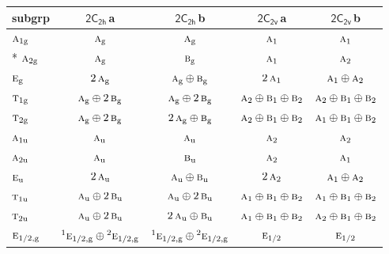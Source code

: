\documentclass[10pt,a4paper]{article}
\numberwithin{equation}{section}
\newcommand{\grp}[1]{\mathsf{#1}}
\newcommand{\irr}[1]{\text{\normalfont\scshape #1}}
\newcommand{\conjpair}[1]{{}^{#1}}
\newcommand{\ptag}[1]{\mathrm{#1}}
\newcommand{\clsletter}[1]{\,{\scriptsize\color{black!55}#1}}
\begin{document}
{\small\begin{longtable}{@{}lcccc@{}}\toprule
subgrp & \href{2C2h.pdf}{$\grp{2C_{2h}}$}\clsletter{a} & \href{2C2h.pdf}{$\grp{2C_{2h}}$}\clsletter{b} & \href{2C2v.pdf}{$\grp{2C_{2v}}$}\clsletter{a} & \href{2C2v.pdf}{$\grp{2C_{2v}}$}\clsletter{b}\\\midrule\endhead
\bottomrule\endfoot\endlastfoot
$\irr{a}_{1\ptag{g}}$ & $\irr{a}_{\ptag{g}}$ & $\irr{a}_{\ptag{g}}$ & $\irr{a}_{1}$ & $\irr{a}_{1}$\\*
$\irr{a}_{2\ptag{g}}$ & $\irr{a}_{\ptag{g}}$ & $\irr{b}_{\ptag{g}}$ & $\irr{a}_{1}$ & $\irr{a}_{2}$\\
$\irr{e}_{\ptag{g}}$ & $2\,\irr{a}_{\ptag{g}}$ & $\irr{a}_{\ptag{g}}\oplus \irr{b}_{\ptag{g}}$ & $2\,\irr{a}_{1}$ & $\irr{a}_{1}\oplus \irr{a}_{2}$\\
$\irr{t}_{1\ptag{g}}$ & $\irr{a}_{\ptag{g}}\oplus 2\,\irr{b}_{\ptag{g}}$ & $\irr{a}_{\ptag{g}}\oplus 2\,\irr{b}_{\ptag{g}}$ & $\irr{a}_{2}\oplus \irr{b}_{1}\oplus \irr{b}_{2}$ & $\irr{a}_{2}\oplus \irr{b}_{1}\oplus \irr{b}_{2}$\\
$\irr{t}_{2\ptag{g}}$ & $\irr{a}_{\ptag{g}}\oplus 2\,\irr{b}_{\ptag{g}}$ & $2\,\irr{a}_{\ptag{g}}\oplus \irr{b}_{\ptag{g}}$ & $\irr{a}_{2}\oplus \irr{b}_{1}\oplus \irr{b}_{2}$ & $\irr{a}_{1}\oplus \irr{b}_{1}\oplus \irr{b}_{2}$\\
$\irr{a}_{1\ptag{u}}$ & $\irr{a}_{\ptag{u}}$ & $\irr{a}_{\ptag{u}}$ & $\irr{a}_{2}$ & $\irr{a}_{2}$\\
$\irr{a}_{2\ptag{u}}$ & $\irr{a}_{\ptag{u}}$ & $\irr{b}_{\ptag{u}}$ & $\irr{a}_{2}$ & $\irr{a}_{1}$\\
$\irr{e}_{\ptag{u}}$ & $2\,\irr{a}_{\ptag{u}}$ & $\irr{a}_{\ptag{u}}\oplus \irr{b}_{\ptag{u}}$ & $2\,\irr{a}_{2}$ & $\irr{a}_{1}\oplus \irr{a}_{2}$\\
$\irr{t}_{1\ptag{u}}$ & $\irr{a}_{\ptag{u}}\oplus 2\,\irr{b}_{\ptag{u}}$ & $\irr{a}_{\ptag{u}}\oplus 2\,\irr{b}_{\ptag{u}}$ & $\irr{a}_{1}\oplus \irr{b}_{1}\oplus \irr{b}_{2}$ & $\irr{a}_{1}\oplus \irr{b}_{1}\oplus \irr{b}_{2}$\\
$\irr{t}_{2\ptag{u}}$ & $\irr{a}_{\ptag{u}}\oplus 2\,\irr{b}_{\ptag{u}}$ & $2\,\irr{a}_{\ptag{u}}\oplus \irr{b}_{\ptag{u}}$ & $\irr{a}_{1}\oplus \irr{b}_{1}\oplus \irr{b}_{2}$ & $\irr{a}_{2}\oplus \irr{b}_{1}\oplus \irr{b}_{2}$\\
$\irr{e}_{1/2,\ptag{g}}$ & $\conjpair{1}\irr{e}_{1/2,\ptag{g}}\oplus \conjpair{2}\irr{e}_{1/2,\ptag{g}}$ & $\conjpair{1}\irr{e}_{1/2,\ptag{g}}\oplus \conjpair{2}\irr{e}_{1/2,\ptag{g}}$ & $\irr{e}_{1/2}$ & $\irr{e}_{1/2}$\\

\end{longtable}}
\end{document}
